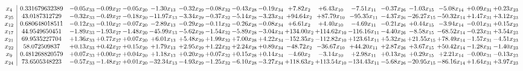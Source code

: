 \documentclass[9pt]{article}
\begin{document}
 \[\begin{array}{c| c c@{\hskip 2pt} c@{\hskip 2pt} c@{\hskip 2pt} c@{\hskip 2pt} c@{\hskip 2pt} c@{\hskip 2pt} c@{\hskip 2pt} c@{\hskip 2pt} c@{\hskip 2pt} c@{\hskip 2pt} c@{\hskip 2pt} c@{\hskip 2pt} c@{\hskip 2pt} c@{\hskip 2pt} c@{\hskip 2pt} c@{\hskip 2pt} }
 x_{4}   &  0.331679632389 & -0.05 x_{33} & -0.09 x_{27} & -0.05 x_{20} & -1.30 x_{13} & -0.32 x_{29} & -0.08 x_{32} & -0.43 x_{28} & -0.19 x_{34} & +  7.82 x_{2} & +  6.43 x_{10} & -7.51 x_{11} & -0.37 x_{26} & -1.03 x_{15} & -5.08 x_{14} & +  0.09 x_{31} & +  0.23 x_{23}\\
 x_{25}   &  43.0187312729 & -0.32 x_{33} & -0.49 x_{27} & -0.18 x_{20} & -11.97 x_{13} & -3.34 x_{29} & -0.37 x_{32} & -5.14 x_{28} & -3.23 x_{34} & + 94.64 x_{2} & + 87.79 x_{10} & -95.35 x_{11} & -4.37 x_{26} & -26.27 x_{15} & -50.32 x_{14} & +  1.47 x_{31} & +  3.12 x_{23}\\
 x_{12}   &  0.680648018511 & -0.12 x_{33} & -0.10 x_{27} & -0.07 x_{20} & -2.89 x_{13} & -0.29 x_{29} & -0.11 x_{32} & -0.26 x_{28} & -0.08 x_{34} & +  6.61 x_{2} & +  4.40 x_{10} & -4.69 x_{11} & -0.21 x_{26} & +  0.44 x_{15} & -3.94 x_{14} & -0.01 x_{31} & +  0.15 x_{23}\\
 x_{17}   &  44.9549650451 & -1.89 x_{33} & -1.93 x_{27} & -1.48 x_{20} & -45.99 x_{13} & -5.62 x_{29} & -1.54 x_{32} & -5.89 x_{28} & -3.04 x_{34} & + 134.00 x_{2} & + 114.62 x_{10} & -116.16 x_{11} & -4.40 x_{26} & -8.58 x_{15} & -68.52 x_{14} & -0.23 x_{31} & +  3.54 x_{23}\\
 x_{21}   &  69.9535227704 & +  1.36 x_{33} & +  0.77 x_{27} & +  0.07 x_{20} & +  6.01 x_{13} & +  5.48 x_{29} & +  1.99 x_{32} & +  7.00 x_{28} & +  4.22 x_{34} & -152.35 x_{2} & -112.82 x_{10} & + 123.61 x_{11} & +  5.32 x_{26} & + 21.55 x_{15} & + 78.49 x_{14} & -1.57 x_{31} & -4.51 x_{23}\\
 x_{22}   &  58.072509837 & +  0.13 x_{33} & +  0.42 x_{27} & +  0.15 x_{20} & +  1.79 x_{13} & +  2.95 x_{29} & +  1.22 x_{32} & +  2.24 x_{28} & +  0.89 x_{34} & -48.72 x_{2} & -36.67 x_{10} & + 44.20 x_{11} & +  2.87 x_{26} & +  3.67 x_{15} & + 50.42 x_{14} & -1.28 x_{31} & -1.40 x_{23}\\
 x_{9}   &  0.481268820579 & +  0.07 x_{33} & +  0.00 x_{27} & +  0.04 x_{20} & +  1.18 x_{13} & +  0.20 x_{29} & +  0.07 x_{32} & +  0.15 x_{28} & +  0.14 x_{34} & -4.60 x_{2} & -3.14 x_{10} & +  2.98 x_{11} & +  0.13 x_{26} & +  0.29 x_{15} & +  2.21 x_{14} & -0.00 x_{31} & -0.13 x_{23}\\
 x_{24}   &  73.6505348223 & -0.57 x_{33} & -1.48 x_{27} & +  0.01 x_{20} & -32.34 x_{13} & -4.93 x_{29} & -1.25 x_{32} & -6.10 x_{28} & -3.27 x_{34} & + 118.63 x_{2} & + 113.54 x_{10} & -134.43 x_{11} & -5.68 x_{26} & -20.95 x_{15} & -86.16 x_{14} & +  1.64 x_{31} & +  3.97 x_{23}\\

\end{array}\]
\end{document}
